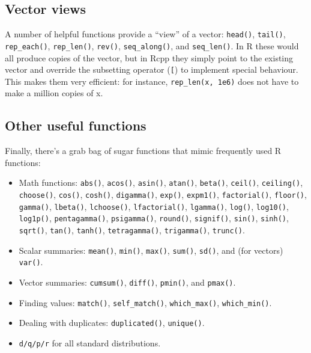 \subsection{Vector views}

A number of helpful functions provide a ``view'' of a vector:
\texttt{head()}, \texttt{tail()}, \texttt{rep\_each()},
\texttt{rep\_len()}, \texttt{rev()}, \texttt{seq\_along()}, and
\texttt{seq\_len()}. In R these would all produce copies of the vector,
but in Rcpp they simply point to the existing vector and override the
subsetting operator (\texttt{{[}}) to implement special behaviour. This
makes them very efficient: for instance, \texttt{rep\_len(x, 1e6)} does
not have to make a million copies of x.

\subsection{Other useful functions}

Finally, there's a grab bag of sugar functions that mimic frequently
used R functions:

\begin{itemize}
\item
  Math functions: \texttt{abs()}, \texttt{acos()}, \texttt{asin()},
  \texttt{atan()}, \texttt{beta()}, \texttt{ceil()}, \texttt{ceiling()},
  \texttt{choose()}, \texttt{cos()}, \texttt{cosh()},
  \texttt{digamma()}, \texttt{exp()}, \texttt{expm1()},
  \texttt{factorial()}, \texttt{floor()}, \texttt{gamma()},
  \texttt{lbeta()}, \texttt{lchoose()}, \texttt{lfactorial()},
  \texttt{lgamma()}, \texttt{log()}, \texttt{log10()}, \texttt{log1p()},
  \texttt{pentagamma()}, \texttt{psigamma()}, \texttt{round()},
  \texttt{signif()}, \texttt{sin()}, \texttt{sinh()}, \texttt{sqrt()},
  \texttt{tan()}, \texttt{tanh()}, \texttt{tetragamma()},
  \texttt{trigamma()}, \texttt{trunc()}.
\item
  Scalar summaries: \texttt{mean()}, \texttt{min()}, \texttt{max()},
  \texttt{sum()}, \texttt{sd()}, and (for vectors) \texttt{var()}.
\item
  Vector summaries: \texttt{cumsum()}, \texttt{diff()}, \texttt{pmin()},
  and \texttt{pmax()}.
\item
  Finding values: \texttt{match()}, \texttt{self\_match()},
  \texttt{which\_max()}, \texttt{which\_min()}.
\item
  Dealing with duplicates: \texttt{duplicated()}, \texttt{unique()}.
\item
  \texttt{d/q/p/r} for all standard distributions.
\end{itemize}

